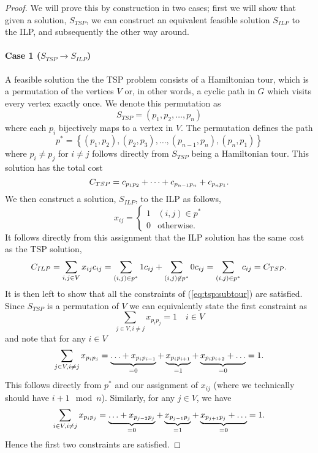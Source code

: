\documentclass[11pt,a4paper,english]{article}
\begin{document}
 \begin{proof}
   We will prove this by construction in two cases; first
 we will show that given a solution, $S_{TSP}$, we can construct an equivalent
 feasible solution $S_{ILP}$ to the ILP, and subsequently the other way around.
 
 \paragraph{Case 1 ($S_{TSP} \to S_{ILP}$)}
 A feasible solution the the TSP problem consists of a Hamiltonian tour, which is a permutation of the vertices $V$ or, in other words, a cyclic path in $G$ which visits
  every vertex exactly once. We denote this permutation as
  $$S_{TSP} = (p_1, p_2, \dots, p_n )$$
  where each $p_i$ bijectively maps to a vertex in $V$. The permutation defines the path
  $$p^* = \left\{ (p_1, p_2), (p_2, p_3),\ldots,(p_{n-1}, p_{n}), (p_n, p_1) \right\}$$
  where $p_i \neq p_j$ for $i\neq j$ follows directly from $S_{TSP}$
   being a Hamiltonian tour. This solution has the total cost
  $$C_{{TSP}} = c_{p_1p_2} + \dots + c_{p_{n-1}p_{n}} + c_{p_{n}p_1}\mathnormal{.}$$
  We then construct a solution, $S_{ILP}$, to the ILP as follows,
  $$x_{ij} =
  \begin{cases}
    1 & (i,j) \in p^* \\
    0 & \text{otherwise.}
  \end{cases}
  $$
  It follows directly from this assignment that the ILP
  solution has the same cost as the TSP solution,
$$C_{ILP} = \sum_{i,j \in V} x_{ij}c_{ij} = \sum_{(i,j) \in p^*} 1c_{ij} + \sum_{(i,j) \not\in p^*} 0c_{ij} =  \sum_{(i,j) \in p^*} c_{ij} = C_{{TSP}}\mathnormal{.}$$
It is then left to show that all the constraints of (\ref{eq:tsp:subtour}) are
satisfied. Since $S_{TSP}$ is a permutation of $V$ we can equivalently state
the first constraint as
$$\sum_{j \in V, i \neq j} x_{p_ip_j} = 1 \quad i \in V$$
and note that for any $i \in V$
$$\sum_{j \in V, i \neq j} x_{p_ip_j} = \underbrace{\ldots + x_{p_i p_{i-1}}}_{=0} +
\underbrace{x_{p_i p_{i+1}}}_{=1} + \underbrace{x_{p_i p_{i+2}} + \ldots}_{=0} = 1\mathnormal{.}$$
This follows directly from $p^*$ and our assignment of $x_{ij}$ (where we technically should have $i+1 \mod n$). Similarly, for any $j \in V$, we have
$$\sum_{i \in V, i \neq j} x_{p_ip_j} = \underbrace{\ldots + x_{p_{j-2} p_j}}_{=0} +
\underbrace{x_{p_{j-1} p_j}}_{=1} + \underbrace{x_{p_{j+1} p_j} + \ldots}_{=0} = 1\mathnormal{.}$$
Hence the first two constraints are satisfied.


\end{proof}
\end{document}
